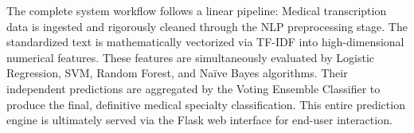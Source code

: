 The complete system workflow follows a linear pipeline: Medical transcription data is ingested and rigorously cleaned through the NLP preprocessing stage. The standardized text is mathematically vectorized via TF-IDF into high-dimensional numerical features. These features are simultaneously evaluated by Logistic Regression, SVM, Random Forest, and Naïve Bayes algorithms. Their independent predictions are aggregated by the Voting Ensemble Classifier to produce the final, definitive medical specialty classification. This entire prediction engine is ultimately served via the Flask web interface for end-user interaction.
